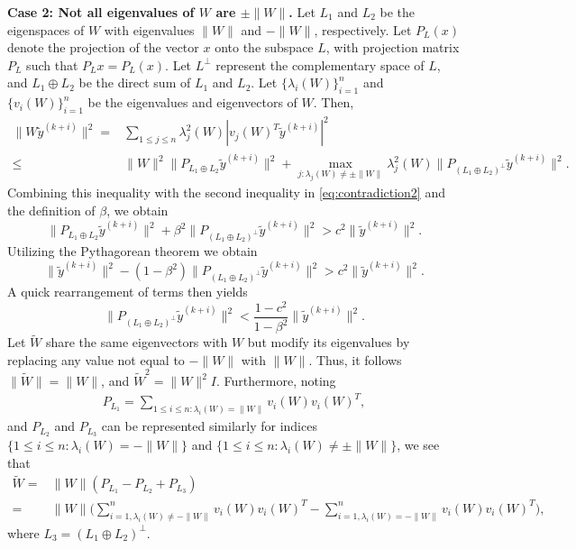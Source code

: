 \documentclass[11pt]{article}
\begin{document}
{{\textbf{Case 2: Not all eigenvalues of $W$ are $\pm\|W\|$.}
Let $L_1$ and $L_2$ be the eigenspaces of $W$ with eigenvalues $\|W\|$ and $-\|W\|$, respectively. Let $P_{L}(x)$ denote the projection of the vector $x$ onto the subspace $L$, with projection matrix $P_L$ such that $P_L x = P_L(x)$. Let  $L^\perp$ represent the complementary space of $L$, and   $L_1\oplus L_2$ be the direct sum of $L_1$ and $L_2$. Let $\{\lambda_i(W)\}_{i=1}^n$ and $\{v_i(W)\}_{i=1}^n$ be the eigenvalues and eigenvectors of $W$.
Then, 
\begin{align*}
\|W \widetilde{y}^{(k+i)}\|^2=&\sum_{1\leq j\leq n} \lambda_j^2(W)|v_j(W)^T\widetilde{y}^{(k+i)}|^2\\\leq& \|W\|^2\|P_{L_1\oplus L_2}\widetilde{y}^{(k+i)}\|^2+\max_{j: \lambda_j(W)\neq \pm\|W\|}\lambda_j^2(W)\|P_{(L_1\oplus L_2)^\perp}\widetilde{y}^{(k+i)}\|^2.
\end{align*}
Combining this inequality with the second inequality in \eqref{eq:contradiction2} and the definition of $\beta$, we obtain
\[
\|P_{L_1\oplus L_2}\widetilde{y}^{(k+i)}\|^2+\beta^2\|P_{(L_1\oplus L_2)^\perp}\widetilde{y}^{(k+i)}\|^2> c^2\|\widetilde{y}^{(k+i)}\|^2. 
\]
Utilizing the Pythagorean theorem we obtain
\[\|\widetilde{y}^{(k+i)}\|^2-(1-\beta^2)\|P_{(L_1\oplus L_2)^\perp}\widetilde{y}^{(k+i)}\|^2> c^2\|\widetilde{y}^{(k+i)}\|^2.
\]
A quick rearrangement of terms then yields  
\begin{equation}\label{eq:nearL}
\|P_{(L_1\oplus L_2)^\perp}\widetilde{y}^{(k+i)}\|^2< \frac{1-c^2}{1-\beta^2}\|\widetilde{y}^{(k+i)}\|^2.
\end{equation}
Let $\widetilde{W}$ share the same eigenvectors with $W$ but modify its eigenvalues by replacing any value not equal to $-\|W\|$ with $\|W\|$. 
Thus, it follows $\|\widetilde{W}\|=\|W\|$, and $\widetilde{W}^2=\|W\|^2I$. 
Furthermore, noting 
\begin{align}
P_{L_1}=\sum_{1\leq i\leq n: \lambda_i(W)=\|W\|}v_i(W)v_i(W)^T,
\end{align}
and $P_{L_2}$ and $P_{L_3}$ can be represented similarly for indices $\{1\leq i\leq n: \lambda_i(W)=-\|W\|\}$ and $\{1\leq i\leq n: \lambda_i(W)\neq\pm\|W\|\}$, we see that 
\begin{align*}
\widetilde{W}=&\|W\|(P_{L_1}-P_{L_2}+P_{L_3})\\=&
\|W\|\Big(\sum_{i=1, \lambda_i(W)\neq -\|W\|}^nv_i(W)v_i(W)^T-\sum_{i=1, \lambda_i(W)=-\|W\|}^nv_i(W)v_i(W)^T\Big),\end{align*}
where $L_3=(L_1\oplus L_2)^\perp.$ 
}}
\end{document}
